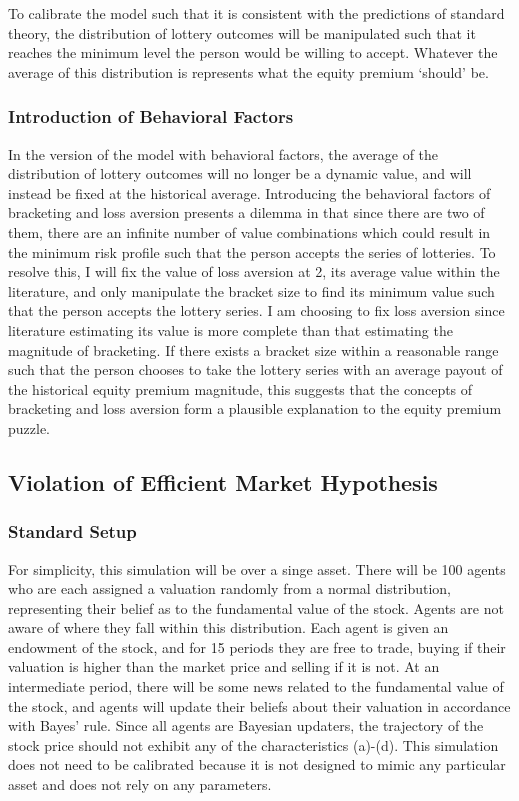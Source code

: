 \documentclass[10pt,twocolumn]{article}
\begin{document}
To calibrate the model such that it is consistent with the predictions of standard theory, the distribution of lottery outcomes will be manipulated such that it reaches the minimum level the person would be willing to accept. Whatever the average of this distribution is represents what the equity premium ‘should’ be. 

\subsubsection{Introduction of Behavioral Factors}
In the version of the model with behavioral factors, the average of the distribution of lottery outcomes will no longer be a dynamic value, and will instead be fixed at the historical average. Introducing the behavioral factors of bracketing and loss aversion presents a dilemma in that since there are two of them, there are an infinite number of value combinations which could result in the minimum risk profile such that the person accepts the series of lotteries. To resolve this, I will fix the value of loss aversion at 2, its average value within the literature, and only manipulate the bracket size to find its minimum value such that the person accepts the lottery series. I am choosing to fix loss aversion since literature estimating its value is more complete than that estimating the magnitude of bracketing. If there exists a bracket size within a reasonable range such that the person chooses to take the lottery series with an average payout of the historical equity premium magnitude, this suggests that the concepts of bracketing and loss aversion form a plausible explanation to the equity premium puzzle. 

\subsection{Violation of Efficient Market Hypothesis}
\subsubsection{Standard Setup}
For simplicity, this simulation will be over a singe asset. There will be 100 agents who are each assigned a valuation randomly from a normal distribution, representing their belief as to the fundamental value of the stock. Agents are not aware of where they fall within this distribution. Each agent is given an endowment of the stock, and for 15 periods they are free to trade, buying if their valuation is higher than the market price and selling if it is not. At an intermediate period, there will be some news related to the fundamental value of the stock, and agents will update their beliefs about their valuation in accordance with Bayes’ rule. Since all agents are Bayesian updaters, the trajectory of the stock price should not exhibit any of the characteristics (a)-(d). This simulation does not need to be calibrated because it is not designed to mimic any particular asset and does not rely on any parameters. 
\end{document}
